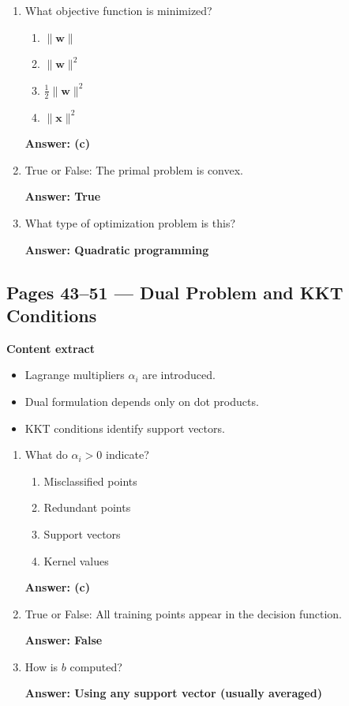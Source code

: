 \documentclass[12pt]{article}
\begin{document}
\begin{enumerate}
	\item What objective function is minimized?
	\begin{enumerate}
		\item $\|\mathbf{w}\|$
		\item $\|\mathbf{w}\|^2$
		\item $\frac{1}{2}\|\mathbf{w}\|^2$
		\item $\|\mathbf{x}\|^2$
	\end{enumerate}
	\textbf{Answer: (c)}
	
	\item True or False: The primal problem is convex.
	
	\textbf{Answer: True}
	
	\item What type of optimization problem is this?
	
	\textbf{Answer: Quadratic programming}
\end{enumerate}


\subsection*{Pages 43--51 — Dual Problem and KKT Conditions}

\textbf{Content extract}
\begin{itemize}
	\item Lagrange multipliers $\alpha_i$ are introduced.
	\item Dual formulation depends only on dot products.
	\item KKT conditions identify support vectors.
\end{itemize}

\begin{enumerate}
	\item What do $\alpha_i > 0$ indicate?
	\begin{enumerate}
		\item Misclassified points
		\item Redundant points
		\item Support vectors
		\item Kernel values
	\end{enumerate}
	\textbf{Answer: (c)}
	
	\item True or False: All training points appear in the decision function.
	
	\textbf{Answer: False}
	
	\item How is $b$ computed?
	
	\textbf{Answer: Using any support vector (usually averaged)}
\end{enumerate}
\end{document}
